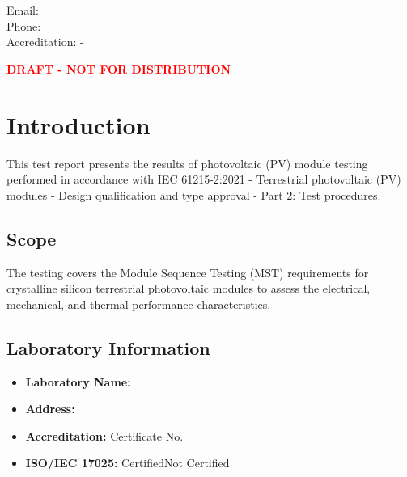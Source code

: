 \documentclass[11pt,a4paper]{article}
\begin{document}
\begin{titlepage}
    \vfill

    {\small
     \\
     \\
    Email:  \\
    Phone:  \\
    Accreditation:  - 
    }

    \vspace{0.5cm}
    {\Large \textcolor{red}{\textbf{DRAFT - NOT FOR DISTRIBUTION}}}

\end{titlepage}

\tableofcontents
\newpage

\listoffigures
\listoftables
\newpage

\section{Introduction}

This test report presents the results of photovoltaic (PV) module testing performed in accordance with IEC 61215-2:2021 - Terrestrial photovoltaic (PV) modules - Design qualification and type approval - Part 2: Test procedures.

\subsection{Scope}

The testing covers the Module Sequence Testing (MST) requirements for crystalline silicon terrestrial photovoltaic modules to assess the electrical, mechanical, and thermal performance characteristics.

\subsection{Laboratory Information}

\begin{itemize}
    \item \textbf{Laboratory Name:} 
    \item \textbf{Address:} 
    \item \textbf{Accreditation:}  Certificate No. 
    \item \textbf{ISO/IEC 17025:} CertifiedNot Certified
\end{itemize}
\end{document}
